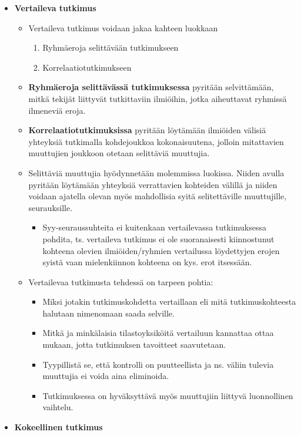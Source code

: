 \documentclass[
]{book}
\providecommand{\tightlist}{%
  \setlength{\itemsep}{0pt}\setlength{\parskip}{0pt}}
\begin{document}
\begin{itemize}
\tightlist
\item
  \textbf{Vertaileva tutkimus}

  \begin{itemize}
  \tightlist
  \item
    Vertaileva tutkimus voidaan jakaa kahteen luokkaan

    \begin{enumerate}
    \def\labelenumi{\arabic{enumi}.}
    \tightlist
    \item
      Ryhmäeroja selittävään tutkimukseen
    \item
      Korrelaatiotutkimukseen
    \end{enumerate}
  \item
    \textbf{Ryhmäeroja selittävässä tutkimuksessa} pyritään selvittämään, mitkä tekijät liittyvät tutkittaviin ilmiöihin, jotka aiheuttavat ryhmissä ilmeneviä eroja.
  \item
    \textbf{Korrelaatiotutkimuksissa} pyritään löytämään ilmiöiden välisiä yhteyksiä tutkimalla kohdejoukkoa kokonaisuutena, jolloin mitattavien muuttujien joukkoon otetaan selittäviä muuttujia.
  \item
    Selittäviä muuttujia hyödynnetään molemmissa luokissa. Niiden avulla pyritään löytämään yhteyksiä verrattavien kohteiden välillä ja niiden voidaan ajatella olevan myös mahdollisia syitä selitettäville muuttujille, seurauksille.

    \begin{itemize}
    \tightlist
    \item
      Syy-seuraussuhteita ei kuitenkaan vertailevassa tutkimuksessa pohdita, ts. vertaileva tutkimus ei ole suoranaisesti kiinnostunut kohteena olevien ilmiöiden/ryhmien vertailussa löydettyjen erojen syistä vaan mielenkiinnon kohteena on kys. erot itsessään.
    \end{itemize}
  \item
    Vertailevaa tutkimusta tehdessä on tarpeen pohtia:

    \begin{itemize}
    \tightlist
    \item
      Miksi jotakin tutkimuskohdetta vertaillaan eli mitä tutkimuskohteesta halutaan nimenomaan saada selville.
    \item
      Mitkä ja minkälaisia tilastoyksiköitä vertailuun kannattaa ottaa mukaan, jotta tutkimuksen tavoitteet saavutetaan.
    \item
      Tyypillistä se, että kontrolli on puutteellista ja ns. väliin tulevia muuttujia ei voida aina eliminoida.
    \item
      Tutkimuksessa on hyväksyttävä myös muuttujiin liittyvä luonnollinen vaihtelu.
    \end{itemize}
  \end{itemize}
\item
  \textbf{Kokeellinen tutkimus}


\end{itemize}
\end{document}

